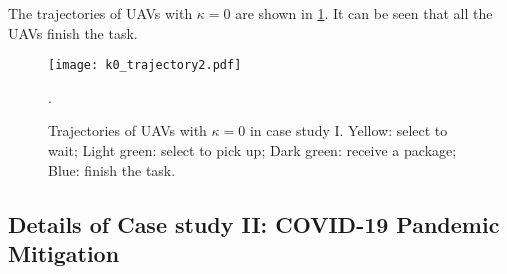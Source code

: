 \documentclass[conf]{new-aiaa}
\begin{document}
The trajectories of UAVs with $\kappa=0$ are shown in \cref{grid_result}. It can be seen  that all the UAVs finish the task.

\begin{figure}[H]
\centering
\texttt{[image: k0\_trajectory2.pdf]}
\caption{Trajectories of UAVs with $\kappa=0$ in case study I. Yellow: select to wait; Light green: select to pick up; Dark green: receive a package; Blue: finish the task.}.
\label{grid_result}
\end{figure}

\subsection{Details of Case study II: COVID-19 Pandemic Mitigation}
\end{document}
